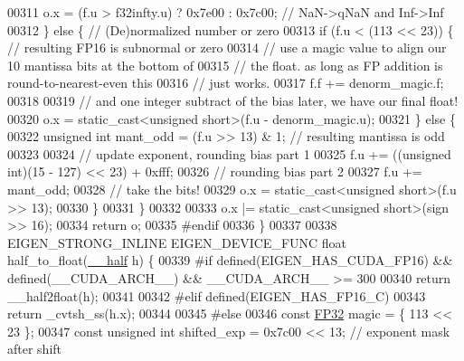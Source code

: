 \begin{DoxyCode}
00311     o.x = (f.u > f32infty.u) ? 0x7e00 : 0x7c00; \textcolor{comment}{// NaN->qNaN and Inf->Inf}
00312   \} \textcolor{keywordflow}{else} \{  \textcolor{comment}{// (De)normalized number or zero}
00313     \textcolor{keywordflow}{if} (f.u < (113 << 23)) \{  \textcolor{comment}{// resulting FP16 is subnormal or zero}
00314       \textcolor{comment}{// use a magic value to align our 10 mantissa bits at the bottom of}
00315       \textcolor{comment}{// the float. as long as FP addition is round-to-nearest-even this}
00316       \textcolor{comment}{// just works.}
00317       f.f += denorm\_magic.f;
00318 
00319       \textcolor{comment}{// and one integer subtract of the bias later, we have our final float!}
00320       o.x = \textcolor{keyword}{static\_cast<}\textcolor{keywordtype}{unsigned} \textcolor{keywordtype}{short}\textcolor{keyword}{>}(f.u - denorm\_magic.u);
00321     \} \textcolor{keywordflow}{else} \{
00322       \textcolor{keywordtype}{unsigned} \textcolor{keywordtype}{int} mant\_odd = (f.u >> 13) & 1; \textcolor{comment}{// resulting mantissa is odd}
00323 
00324       \textcolor{comment}{// update exponent, rounding bias part 1}
00325       f.u += ((\textcolor{keywordtype}{unsigned} int)(15 - 127) << 23) + 0xfff;
00326       \textcolor{comment}{// rounding bias part 2}
00327       f.u += mant\_odd;
00328       \textcolor{comment}{// take the bits!}
00329       o.x = \textcolor{keyword}{static\_cast<}\textcolor{keywordtype}{unsigned} \textcolor{keywordtype}{short}\textcolor{keyword}{>}(f.u >> 13);
00330     \}
00331   \}
00332 
00333   o.x |= \textcolor{keyword}{static\_cast<}\textcolor{keywordtype}{unsigned} \textcolor{keywordtype}{short}\textcolor{keyword}{>}(sign >> 16);
00334   \textcolor{keywordflow}{return} o;
00335 \textcolor{preprocessor}{#endif}
00336 \}
00337 
00338 EIGEN\_STRONG\_INLINE EIGEN\_DEVICE\_FUNC \textcolor{keywordtype}{float} half\_to\_float(\hyperlink{struct_eigen_1_1half__impl_1_1____half}{\_\_half} h) \{
00339 \textcolor{preprocessor}{#if defined(EIGEN\_HAS\_CUDA\_FP16) && defined(\_\_CUDA\_ARCH\_\_) && \_\_CUDA\_ARCH\_\_ >= 300}
00340   \textcolor{keywordflow}{return} \_\_half2float(h);
00341 
00342 \textcolor{preprocessor}{#elif defined(EIGEN\_HAS\_FP16\_C)}
00343   \textcolor{keywordflow}{return} \_cvtsh\_ss(h.x);
00344 
00345 \textcolor{preprocessor}{#else}
00346   \textcolor{keyword}{const} \hyperlink{union_eigen_1_1half__impl_1_1_f_p32}{FP32} magic = \{ 113 << 23 \};
00347   \textcolor{keyword}{const} \textcolor{keywordtype}{unsigned} \textcolor{keywordtype}{int} shifted\_exp = 0x7c00 << 13; \textcolor{comment}{// exponent mask after shift}

\end{DoxyCode}
